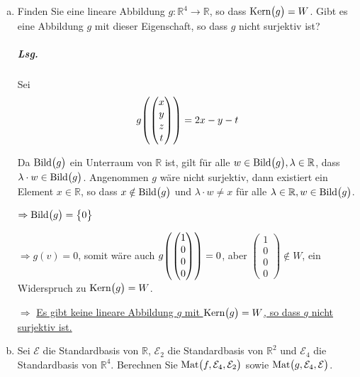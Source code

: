 \documentclass{scrreprt}
\newcommand\Bild{\text{Bild}}
\newcommand\Kern{\text{Kern}}
\newcommand\Mat{\text{Mat}}
\begin{document}
\begin{enumerate}[(a)]
\item Finden Sie eine lineare Abbildung $g \colon \mathbb{R}^4 \to \mathbb{R}$,
  so dass $\Kern\qty\big(g) = W$.
  Gibt es eine Abbildung $g$ mit dieser Eigenschaft, so dass $g$ nicht
  surjektiv ist?
  \subparagraph{Lsg.} Sei
  \[
    g\qty(\begin{pmatrix} x \\ y \\ z \\ t \end{pmatrix}) = 2x - y - t
  \]

  Da $\Bild\qty\big(g)$ ein Unterraum von $\mathbb{R}$ ist,
  gilt für alle $w \in \Bild\qty\big(g), \lambda \in \mathbb{R}$, dass
  $\lambda \cdot w \in \Bild\qty\big(g)$.
  Angenommen $g$ wäre nicht surjektiv, dann existiert ein Element
  $x \in \mathbb{R}$, so dass $x \notin \Bild\qty\big(g)$ und
  $\lambda \cdot w \ne x$ für alle
  $\lambda \in \mathbb{R}, w \in \Bild\qty\big(g)$.

  $\Rightarrow \Bild\qty\big(g) = \qty\big{0}$

  $\Rightarrow g(v) = 0$, somit wäre auch
  $g\qty(\begin{pmatrix} 1 \\ 0 \\ 0 \\ 0\end{pmatrix}) = 0$, aber
  $\begin{pmatrix} 1 \\ 0 \\ 0 \\ 0\end{pmatrix} \notin W$, ein Widerspruch zu
  $\Kern\qty\big(g) = W$.

  $\Rightarrow$ \underline{Es gibt keine lineare Abbildung $g$ mit
    $\Kern\qty\big(g) = W$, so dass $g$ nicht surjektiv ist.}

\item Sei $\mathcal{E}$ die Standardbasis von $\mathbb{R}$,
  $\mathcal{E}_2$ die Standardbasis von $\mathbb{R}^2$ und $\mathcal{E}_4$ die
  Standardbasis von $\mathbb{R}^4$.
  Berechnen Sie $\Mat\qty\big(f, \mathcal{E}_4, \mathcal{E}_2)$ sowie
  $\Mat\qty\big(g, \mathcal{E}_4, \mathcal{E})$.


\end{enumerate}
\end{document}
